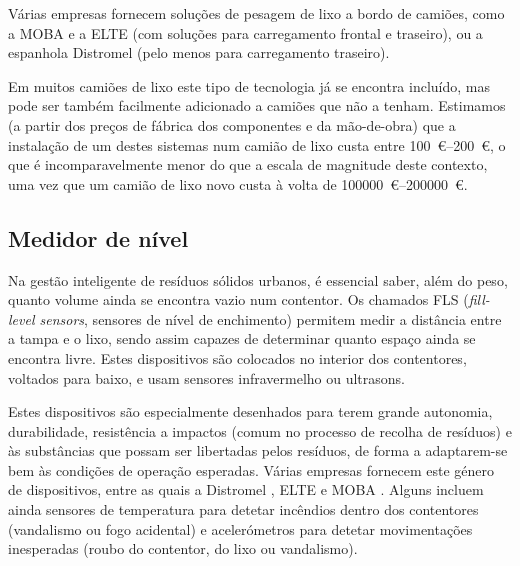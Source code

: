 \documentclass[11pt, a4paper, oneside]{book}
\begin{document}
Várias empresas fornecem soluções de pesagem de lixo a bordo de camiões, como a MOBA \cite{moba} e a ELTE \cite{elte-dynamic-weighing} (com soluções para carregamento frontal e traseiro), ou a espanhola Distromel \cite{distromel-generic, distromel-news} (pelo menos para carregamento traseiro).

Em muitos camiões de lixo este tipo de tecnologia já se encontra incluído, mas pode ser também facilmente adicionado a camiões que não a tenham. Estimamos (a partir dos preços de fábrica dos componentes e da mão-de-obra) que a instalação de um destes sistemas num camião de lixo custa entre \SIrange{100}{200}{\euro}, o que é incomparavelmente menor do que a escala de magnitude deste contexto, uma vez que um camião de lixo novo custa à volta de \SIrange{100000}{200000}{\euro}.

\subsection{Medidor de nível}

Na gestão inteligente de resíduos sólidos urbanos, é essencial saber, além do peso, quanto volume ainda se encontra vazio num contentor. Os chamados FLS (\textit{fill-level sensors}, sensores de nível de enchimento) permitem medir a distância entre a tampa e o lixo, sendo assim capazes de determinar quanto espaço ainda se encontra livre. Estes dispositivos são colocados no interior dos contentores, voltados para baixo, e usam sensores infravermelho ou ultrasons.

Estes dispositivos são especialmente desenhados para terem grande autonomia, durabilidade, resistência a impactos (comum no processo de recolha de resíduos) e às substâncias que possam ser libertadas pelos resíduos, de forma a adaptarem-se bem às condições de operação esperadas. Várias empresas fornecem este género de dispositivos, entre as quais a Distromel \cite{distromel-generic}, ELTE \cite{elte-fls} e MOBA \cite{moba-fls}. Alguns incluem ainda sensores de temperatura para detetar incêndios dentro dos contentores (vandalismo ou fogo acidental) e acelerómetros para detetar movimentações inesperadas (roubo do contentor, do lixo ou vandalismo).
\end{document}

